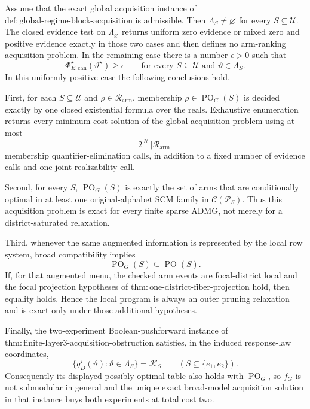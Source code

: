 Assume that the exact global acquisition instance of \(\mathrm{def:global\text{-}regime\text{-}block\text{-}acquisition}\) is admissible.  Then \(\Lambda_S\ne\varnothing\) for every \(S\subseteq\mathcal U\).  The closed evidence test on \(\Lambda_{\varnothing}\) returns uniform zero evidence or mixed zero and positive evidence exactly in those two cases and then defines no arm-ranking acquisition problem.  In the remaining case there is a number \(\epsilon>0\) such that
\[
\Phi_{E,\mathrm{can}}^\star(\vartheta^\star)\geq\epsilon
\qquad
\text{for every }S\subseteq\mathcal U\text{ and }\vartheta\in\Lambda_S.
\]
In this uniformly positive case the following conclusions hold.

First, for each \(S\subseteq\mathcal U\) and \(\rho\in\mathcal R_{\mathrm{arm}}\), membership \(\rho\in\operatorname{PO}_G(S)\) is decided exactly by one closed existential formula over the reals.  Exhaustive enumeration returns every minimum-cost solution of the global acquisition problem using at most
\[
2^{|\mathcal U|}|\mathcal R_{\mathrm{arm}}|
\]
membership quantifier-elimination calls, in addition to a fixed number of evidence calls and one joint-realizability call.

Second, for every \(S\), \(\operatorname{PO}_G(S)\) is exactly the set of arms that are conditionally optimal in at least one original-alphabet SCM family in \(\mathcal C(\mathcal P_S)\).  Thus this acquisition problem is exact for every finite sparse ADMG, not merely for a district-saturated relaxation.

Third, whenever the same augmented information is represented by the local row system, broad compatibility implies
\[
\operatorname{PO}_G(S)\subseteq\operatorname{PO}(S).
\]
If, for that augmented menu, the checked arm events are focal-district local and the focal projection hypotheses of \(\mathrm{thm:one\text{-}district\text{-}fiber\text{-}projection}\) hold, then equality holds.  Hence the local program is always an outer pruning relaxation and is exact only under those additional hypotheses.

Finally, the two-experiment Boolean-pushforward instance of \(\mathrm{thm:finite\text{-}layer3\text{-}acquisition\text{-}obstruction}\) satisfies, in the induced response-law coordinates,
\[
\{q_D^\star(\vartheta):\vartheta\in\Lambda_S\}=\mathcal K_S
\qquad(S\subseteq\{e_1,e_2\}).
\]
Consequently its displayed possibly-optimal table also holds with \(\operatorname{PO}_G\), so \(f_G\) is not submodular in general and the unique exact broad-model acquisition solution in that instance buys both experiments at total cost two.